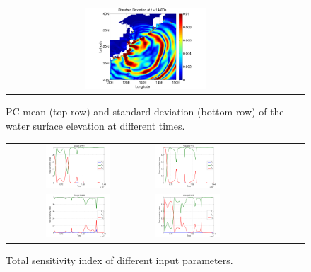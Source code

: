\begin{figure}[ht]
\begin{tabular}{ccc}
\hspace*{-45pt}
\includegraphics[width=0.45\textwidth]{./figures/sigma2d4.pdf}
\end{tabular}
\caption{PC mean (top row) and standard deviation (bottom row) of the water surface elevation at different times.}
\label{fig:mean2d}
\end{figure}

\begin{figure}[ht]
\begin{tabular}{clc}
\includegraphics[width=0.475\textwidth]{./figures/sens1.pdf} &
\includegraphics[width=0.475\textwidth]{./figures/sens2.pdf} \\
\includegraphics[width=0.475\textwidth]{./figures/sens3.pdf} &
\includegraphics[width=0.475\textwidth]{./figures/sens4.pdf}
\end{tabular}
\caption{Total sensitivity index of different input parameters.}
\label{fig:sens}
\end{figure}

